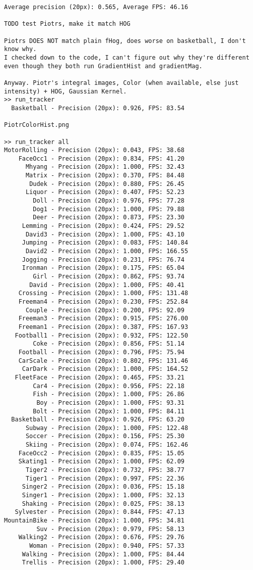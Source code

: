 \begin{lstlisting}
Average precision (20px): 0.565, Average FPS: 46.16
        
TODO test Piotrs, make it match HOG

Piotrs DOES NOT match plain fHog, does worse on basketball, I don't know why.
I checked down to the code, I can't figure out why they're different even though they both run GradientHist and gradientMag.

Anyway. Piotr's integral images, Color (when available, else just intensity) + HOG, Gaussian Kernel.
>> run_tracker
  Basketball - Precision (20px): 0.926, FPS: 83.54

PiotrColorHist.png

>> run_tracker all
MotorRolling - Precision (20px): 0.043, FPS: 38.68
    FaceOcc1 - Precision (20px): 0.834, FPS: 41.20
      Mhyang - Precision (20px): 1.000, FPS: 32.43
      Matrix - Precision (20px): 0.370, FPS: 84.48
       Dudek - Precision (20px): 0.880, FPS: 26.45
      Liquor - Precision (20px): 0.407, FPS: 52.23
        Doll - Precision (20px): 0.976, FPS: 77.28
        Dog1 - Precision (20px): 1.000, FPS: 79.88
        Deer - Precision (20px): 0.873, FPS: 23.30
     Lemming - Precision (20px): 0.424, FPS: 29.52
      David3 - Precision (20px): 1.000, FPS: 43.10
     Jumping - Precision (20px): 0.083, FPS: 140.84
      David2 - Precision (20px): 1.000, FPS: 166.55
     Jogging - Precision (20px): 0.231, FPS: 76.74
     Ironman - Precision (20px): 0.175, FPS: 65.04
        Girl - Precision (20px): 0.862, FPS: 93.74
       David - Precision (20px): 1.000, FPS: 40.41
    Crossing - Precision (20px): 1.000, FPS: 131.48
    Freeman4 - Precision (20px): 0.230, FPS: 252.84
      Couple - Precision (20px): 0.200, FPS: 92.09
    Freeman3 - Precision (20px): 0.915, FPS: 276.00
    Freeman1 - Precision (20px): 0.387, FPS: 167.93
   Football1 - Precision (20px): 0.932, FPS: 122.50
        Coke - Precision (20px): 0.856, FPS: 51.14
    Football - Precision (20px): 0.796, FPS: 75.94
    CarScale - Precision (20px): 0.802, FPS: 131.46
     CarDark - Precision (20px): 1.000, FPS: 164.52
   FleetFace - Precision (20px): 0.465, FPS: 33.21
        Car4 - Precision (20px): 0.956, FPS: 22.18
        Fish - Precision (20px): 1.000, FPS: 26.86
         Boy - Precision (20px): 1.000, FPS: 93.31
        Bolt - Precision (20px): 1.000, FPS: 84.11
  Basketball - Precision (20px): 0.926, FPS: 63.20
      Subway - Precision (20px): 1.000, FPS: 122.48
      Soccer - Precision (20px): 0.156, FPS: 25.30
      Skiing - Precision (20px): 0.074, FPS: 162.46
    FaceOcc2 - Precision (20px): 0.835, FPS: 15.05
    Skating1 - Precision (20px): 1.000, FPS: 62.09
      Tiger2 - Precision (20px): 0.732, FPS: 38.77
      Tiger1 - Precision (20px): 0.997, FPS: 22.36
     Singer2 - Precision (20px): 0.036, FPS: 15.18
     Singer1 - Precision (20px): 1.000, FPS: 32.13
     Shaking - Precision (20px): 0.025, FPS: 38.13
   Sylvester - Precision (20px): 0.844, FPS: 47.13
MountainBike - Precision (20px): 1.000, FPS: 34.81
         Suv - Precision (20px): 0.979, FPS: 58.13
    Walking2 - Precision (20px): 0.676, FPS: 29.76
       Woman - Precision (20px): 0.940, FPS: 57.33
     Walking - Precision (20px): 1.000, FPS: 84.44
     Trellis - Precision (20px): 1.000, FPS: 29.40


\end{lstlisting}
